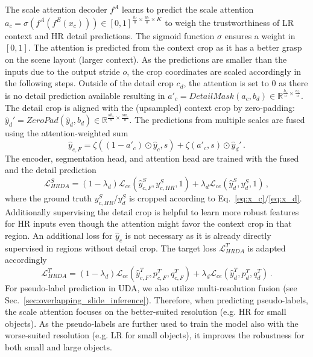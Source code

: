 \documentclass[journal,compsoc]{IEEEtran}
\begin{document}
The scale attention decoder $f^A$ learns to predict the scale attention $a_c = \sigma(f^A(f^E(x_c))) \in [0,1]^{\frac{h_c}{o} \times \frac{w_c}{o} \times K}$ to weigh the trustworthiness of LR context and HR detail predictions. The sigmoid function $\sigma$ ensures a weight in $[0, 1]$.
The attention is predicted from the context crop as it has a better grasp on the scene layout (larger context).
As the predictions are smaller than the inputs due to the output stride $o$, the crop coordinates are scaled accordingly in the following steps. 
Outside of the detail crop $c_d$, the attention is set to 0 as there is no detail prediction available resulting in $a'_c = \mathit{DetailMask}(a_c, b_d) \in \mathbb{R}^{\frac{h_c}{o} \times \frac{w_c}{o}}$.
The detail crop is aligned with the (upsampled) context crop by zero-padding: $\hat{y}_d' = \mathit{ZeroPad}(\hat{y}_d, b_d) \in \mathbb{R}^{\frac{sh_c}{o} \times \frac{sw_c}{o}}$.
The predictions from multiple scales are fused using the attention-weighted sum
\begin{equation}
    \hat{y}_\mathit{c,F} = \zeta((1 - a'_c) \odot \hat{y}_c, s) + \zeta(a'_c, s) \odot \hat{y}_d'\,.
    \label{eq:scale_fusion}
\end{equation}
The encoder, segmentation head, and attention head are trained with the fused and the detail prediction
\begin{equation}
    \mathcal{L}_\mathit{HRDA}^S = (1 - \lambda_d) \mathcal{L}_\mathit{ce}(\hat{y}_{c,F}^S, y_{c,\mathit{HR}}^S, 1) + \lambda_d \mathcal{L}_\mathit{ce}(\hat{y}_{d}^S, y_{d}^S, 1)\,,
\end{equation}
where the ground truth $y_\mathit{c,HR}^S$/$y_d^S$ is cropped according to Eq.~\ref{eq:x_c}/\ref{eq:x_d}. Additionally supervising the detail crop is helpful to learn more robust features for HR inputs even though the attention might favor the context crop in that region. An additional loss for $\hat{y}_c$ is not necessary as it is already directly supervised in regions without detail crop.
The target loss $\mathcal{L}_\mathit{HRDA}^T$ is adapted accordingly
\begin{equation}
    \mathcal{L}_{\mathit{HRDA}}^{T} = 
    (1 - \lambda_d) \mathcal{L}_\mathit{ce}(\hat{y}_{c,F}^{T}, p_{c,F}^{T}, q_{c,F}^{T})
    + \lambda_d \mathcal{L}_\mathit{ce}(\hat{y}_{d}^{T}, p_{d}^{T}, q_{d}^{T})\,.
    \label{eq:L_T,HRDA}
\end{equation}
For pseudo-label prediction in UDA, we also utilize multi-resolution fusion (see Sec.~\ref{sec:overlapping_slide_inference}). Therefore, when predicting pseudo-labels, the scale attention focuses on the better-suited resolution (e.g. HR for small objects). As the pseudo-labels are further used to train the model also with the worse-suited resolution (e.g. LR for small objects), it improves the robustness for both small and large objects. 
\end{document}
